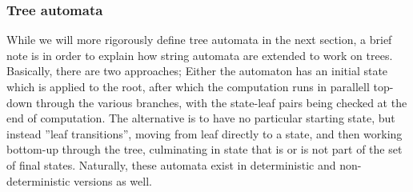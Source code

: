 \subsubsection{Tree automata}

While we will more rigorously define tree automata in the next section, a
brief note is in order to explain how string automata are extended to work
on trees. Basically, there are two approaches; Either the automaton has an
initial state which is applied to the root, after which the computation
runs in parallell top-down through the various branches, with the
state-leaf pairs being checked at the end of computation. The alternative
is to have no particular starting state, but instead ''leaf transitions'',
moving from leaf directly to a state, and then working bottom-up through
the tree, culminating in state that is or is not part of the set of final
states. Naturally, these automata exist in deterministic and
non-deterministic versions as well. 

